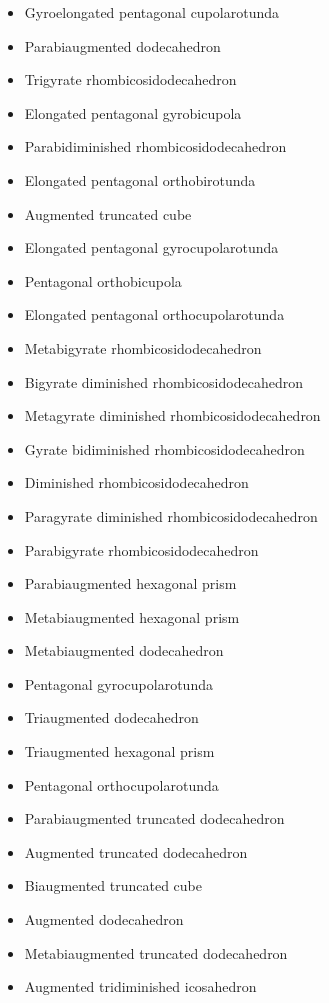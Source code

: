 \begin{itemize}
\item Gyroelongated pentagonal cupolarotunda 
\item Parabiaugmented dodecahedron 
\item Trigyrate rhombicosidodecahedron 
\item Elongated pentagonal gyrobicupola 
\item Parabidiminished rhombicosidodecahedron 
\item Elongated pentagonal orthobirotunda 
\item Augmented truncated cube 
\item Elongated pentagonal gyrocupolarotunda 
\item Pentagonal orthobicupola 
\item Elongated pentagonal orthocupolarotunda 
\item Metabigyrate rhombicosidodecahedron 
\item Bigyrate diminished rhombicosidodecahedron 
\item Metagyrate diminished rhombicosidodecahedron 
\item Gyrate bidiminished rhombicosidodecahedron 
\item Diminished rhombicosidodecahedron 
\item Paragyrate diminished rhombicosidodecahedron 
\item Parabigyrate rhombicosidodecahedron 
\item Parabiaugmented hexagonal prism 
\item Metabiaugmented hexagonal prism 
\item Metabiaugmented dodecahedron 
\item Pentagonal gyrocupolarotunda 
\item Triaugmented dodecahedron 
\item Triaugmented hexagonal prism 
\item Pentagonal orthocupolarotunda 
\item Parabiaugmented truncated dodecahedron 
\item Augmented truncated dodecahedron 
\item Biaugmented truncated cube 
\item Augmented dodecahedron 
\item Metabiaugmented truncated dodecahedron 
\item Augmented tridiminished icosahedron
\end{itemize}